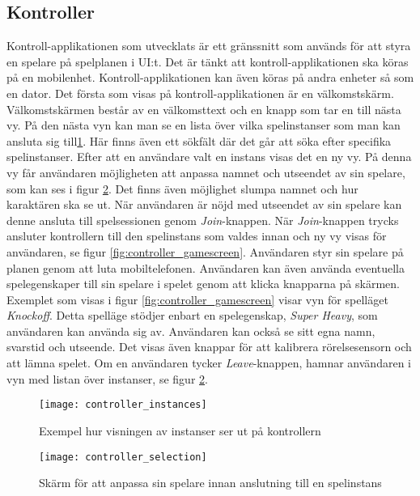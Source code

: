 \subsection{Kontroller}
Kontroll-applikationen som utvecklats är ett gränssnitt som används för att styra en spelare på spelplanen i UI:t. Det är tänkt att kontroll-applikationen ska köras på en mobilenhet. Kontroll-applikationen kan även köras på andra enheter så som en dator. Det första som visas på kontroll-applikationen är en välkomstskärm. Välkomstskärmen består av en välkomsttext och en knapp som tar en till nästa vy. På den nästa vyn kan man se en lista över vilka spelinstanser som man kan ansluta sig till\ref{fig:controller_instances}. Här finns även ett sökfält där det går att söka efter specifika spelinstanser. Efter att en användare valt en instans visas det en ny vy. På denna vy får användaren möjligheten att anpassa namnet och utseendet av sin spelare, som kan ses i figur \ref{fig:controller_selection}. Det finns även möjlighet slumpa namnet och hur karaktären ska se ut. När användaren är nöjd med utseendet av sin spelare kan denne ansluta till spelsessionen genom \textit{Join}-knappen. När \textit{Join}-knappen trycks ansluter kontrollern till den spelinstans som valdes innan och ny vy visas för användaren, se figur \ref{fig:controller_gamescreen}. Användaren styr sin spelare på planen genom att luta mobiltelefonen. Användaren kan även använda eventuella spelegenskaper till sin spelare i spelet genom att klicka knapparna på skärmen. Exemplet som visas i figur \ref{fig:controller_gamescreen} visar vyn för spelläget \textit{Knockoff}. Detta spelläge stödjer enbart en spelegenskap, \textit{Super Heavy}, som användaren kan använda sig av. Användaren kan också se sitt egna namn, svarstid och utseende. Det visas även knappar för att kalibrera rörelsesensorn och att lämna spelet. Om en användaren tycker \textit{Leave}-knappen, hamnar användaren i vyn med listan över instanser, se figur \ref{fig:controller_selection}.

\begin{figure}[h]
    \centering
    \texttt{[image: controller\_instances]}
    \caption{Exempel hur visningen av instanser ser ut på kontrollern}
    \label{fig:controller_instances}
\end{figure}

\begin{figure}[h]
    \centering
    \texttt{[image: controller\_selection]}
    \caption{Skärm för att anpassa sin spelare innan anslutning till en spelinstans}
    \label{fig:controller_selection}
\end{figure}

